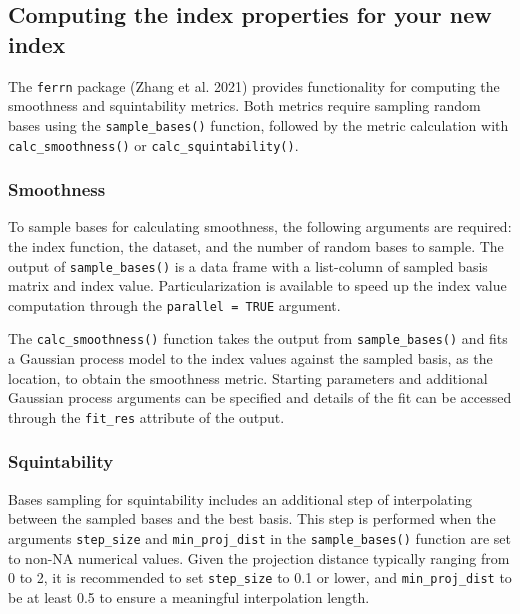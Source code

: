 \documentclass[
  12pt,
]{interact}
\theoremstyle{plain}
\begin{document}
\subsection{Computing the index properties for your new
index}\label{computing-the-index-properties-for-your-new-index}

The \texttt{ferrn} package (Zhang et al. 2021) provides functionality
for computing the smoothness and squintability metrics. Both metrics
require sampling random bases using the \texttt{sample\_bases()}
function, followed by the metric calculation with
\texttt{calc\_smoothness()} or \texttt{calc\_squintability()}.

\subsubsection{Smoothness}\label{smoothness}

To sample bases for calculating smoothness, the following arguments are
required: the index function, the dataset, and the number of random
bases to sample. The output of \texttt{sample\_bases()} is a data frame
with a list-column of sampled basis matrix and index value.
Particularization is available to speed up the index value computation
through the \texttt{parallel\ =\ TRUE} argument.

The \texttt{calc\_smoothness()} function takes the output from
\texttt{sample\_bases()} and fits a Gaussian process model to the index
values against the sampled basis, as the location, to obtain the
smoothness metric. Starting parameters and additional Gaussian process
arguments can be specified and details of the fit can be accessed
through the \texttt{fit\_res} attribute of the output.

\subsubsection{Squintability}\label{squintability}

Bases sampling for squintability includes an additional step of
interpolating between the sampled bases and the best basis. This step is
performed when the arguments \texttt{step\_size} and
\texttt{min\_proj\_dist} in the \texttt{sample\_bases()} function are
set to non-NA numerical values. Given the projection distance typically
ranging from 0 to 2, it is recommended to set \texttt{step\_size} to 0.1
or lower, and \texttt{min\_proj\_dist} to be at least 0.5 to ensure a
meaningful interpolation length.
\end{document}
